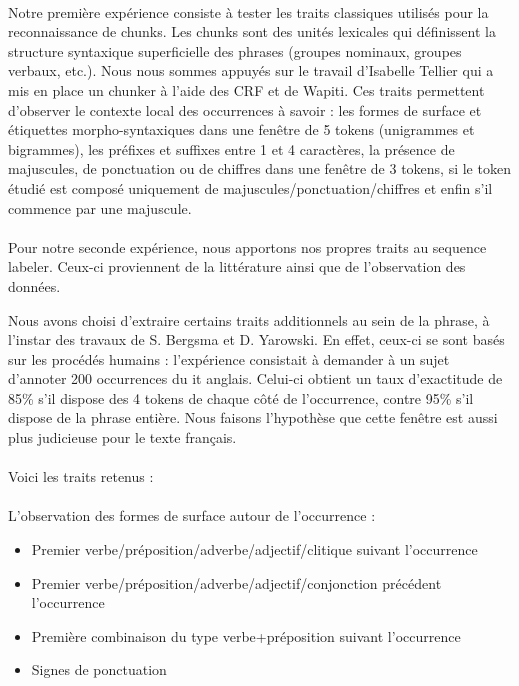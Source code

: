 \documentclass[a4paper,12pt]{article}
\begin{document}
\paragraph{}
Notre première expérience consiste à tester les traits classiques utilisés pour la reconnaissance de chunks. Les chunks sont des unités lexicales qui définissent la structure syntaxique superficielle des phrases (groupes nominaux, groupes verbaux, etc.). Nous nous sommes appuyés sur le travail d'Isabelle Tellier qui a mis en place un chunker à l'aide des CRF et de Wapiti\cite{constant:integrer:taln11}. Ces traits permettent d'observer le contexte local des occurrences à savoir : les formes de surface et étiquettes morpho-syntaxiques dans une fenêtre de 5 tokens (unigrammes et bigrammes), les préfixes et suffixes entre 1 et 4 caractères, la présence de majuscules, de ponctuation ou de chiffres dans une fenêtre de 3 tokens, si le token étudié est composé uniquement de majuscules/ponctuation/chiffres et enfin s'il commence par une majuscule.

\paragraph{}
Pour notre seconde expérience, nous apportons nos propres traits au sequence labeler. Ceux-ci proviennent de la littérature ainsi que de l'observation des données.

Nous avons choisi d'extraire certains traits additionnels au sein de la phrase, à l'instar des travaux de S. Bergsma et D. Yarowski. En effet, ceux-ci se sont basés sur les procédés humains : l'expérience consistait à demander à un sujet d'annoter 200 occurrences du \og{}it\fg{} anglais. Celui-ci obtient un taux d'exactitude de 85\% s'il dispose des 4 tokens de chaque côté de l'occurrence, contre 95\% s'il dispose de la phrase entière. Nous faisons l'hypothèse que cette fenêtre est aussi plus judicieuse pour le texte français.

\paragraph{}
Voici les traits retenus :

\paragraph{}
\textbullet{} L'observation des formes de surface autour de l'occurrence :
 \begin{itemize}
  \item Premier verbe/préposition/adverbe/adjectif/clitique suivant l'occurrence
  \item Premier verbe/préposition/adverbe/adjectif/conjonction précédent l'occurrence
  \item Première combinaison du type verbe+préposition suivant l'occurrence
  \item Signes de ponctuation
 \end{itemize}
 
\end{document}
